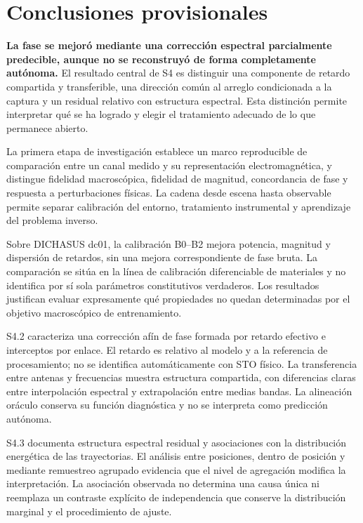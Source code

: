 \chapter{Conclusiones provisionales}
\label{ch:conclusions}

\textbf{La fase se mejoró mediante una corrección espectral parcialmente
predecible, aunque no se reconstruyó de forma completamente autónoma.}
El resultado central de S4 es distinguir una componente de retardo compartida
y transferible, una dirección común al arreglo condicionada a la captura y un
residual relativo con estructura espectral. Esta distinción permite interpretar
qué se ha logrado y elegir el tratamiento adecuado de lo que permanece abierto.


La primera etapa de investigación establece un marco reproducible de comparación entre
un canal medido y su representación electromagnética, y distingue fidelidad macroscópica,
fidelidad de magnitud, concordancia de fase y respuesta a perturbaciones físicas. La
cadena desde escena hasta observable permite separar calibración del entorno, tratamiento
instrumental y aprendizaje del problema inverso.

Sobre DICHASUS dc01, la calibración B0--B2 mejora potencia, magnitud y dispersión de
retardos, sin una mejora correspondiente de fase bruta. La comparación se sitúa en la
línea de calibración diferenciable de materiales y no identifica por sí sola parámetros
constitutivos verdaderos. Los resultados justifican evaluar expresamente qué propiedades
no quedan determinadas por el objetivo macroscópico de entrenamiento.

S4.2 caracteriza una corrección afín de fase formada por retardo efectivo e interceptos
por enlace. El retardo es relativo al modelo y a la referencia de procesamiento; no se
identifica automáticamente con STO físico. La transferencia entre antenas y frecuencias
muestra estructura compartida, con diferencias claras entre interpolación espectral y
extrapolación entre medias bandas. La alineación oráculo conserva su función diagnóstica
y no se interpreta como predicción autónoma.

S4.3 documenta estructura espectral residual y asociaciones con la distribución energética
de las trayectorias. El análisis entre posiciones, dentro de posición y mediante
remuestreo agrupado evidencia que el nivel de agregación modifica la interpretación.
La asociación observada no determina una causa única ni reemplaza un contraste explícito
de independencia que conserve la distribución marginal y el procedimiento de ajuste.

